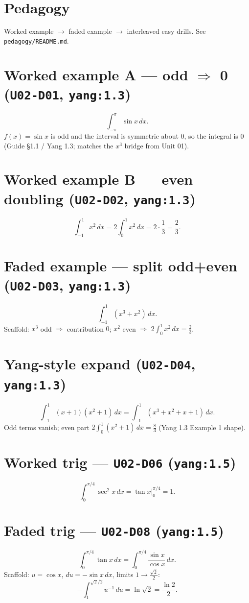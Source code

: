 \section{Pedagogy}
Worked example $\to$ faded example $\to$ interleaved easy drills. See \texttt{pedagogy/README.md}.

\section{Worked example A --- odd $\Rightarrow$ 0 (\texttt{U02-D01}, \texttt{yang:1.3})}
\[
\int_{-\pi}^{\pi}\sin x\,dx.
\]
$f(x)=\sin x$ is odd and the interval is symmetric about 0, so the integral is $0$
(Guide §1.1 / Yang 1.3; matches the $x^3$ bridge from Unit 01).

\section{Worked example B --- even doubling (\texttt{U02-D02}, \texttt{yang:1.3})}
\[
\int_{-1}^{1}x^2\,dx = 2\int_0^1 x^2\,dx = 2\cdot\frac13 = \frac23.
\]

\section{Faded example --- split odd+even (\texttt{U02-D03}, \texttt{yang:1.3})}
\[
\int_{-1}^{1}(x^3+x^2)\,dx.
\]
Scaffold: $x^3$ odd $\Rightarrow$ contribution $0$; $x^2$ even $\Rightarrow$ $2\int_0^1 x^2\,dx=\frac23$.

\section{Yang-style expand (\texttt{U02-D04}, \texttt{yang:1.3})}
\[
\int_{-1}^{1}(x+1)(x^2+1)\,dx = \int_{-1}^{1}(x^3+x^2+x+1)\,dx.
\]
Odd terms vanish; even part $2\int_0^1(x^2+1)\,dx=\frac83$ (Yang 1.3 Example 1 shape).

\section{Worked trig --- \texttt{U02-D06} (\texttt{yang:1.5})}
\[
\int_0^{\pi/4}\sec^2 x\,dx = \tan x\Big|_0^{\pi/4}=1.
\]

\section{Faded trig --- \texttt{U02-D08} (\texttt{yang:1.5})}
\[
\int_0^{\pi/4}\tan x\,dx = \int_0^{\pi/4}\frac{\sin x}{\cos x}\,dx.
\]
Scaffold: $u=\cos x$, $du=-\sin x\,dx$, limits $1\to\frac{\sqrt2}{2}$:
\[
-\int_1^{\sqrt2/2}u^{-1}\,du = \ln\sqrt2 = \frac{\ln 2}{2}.
\]

